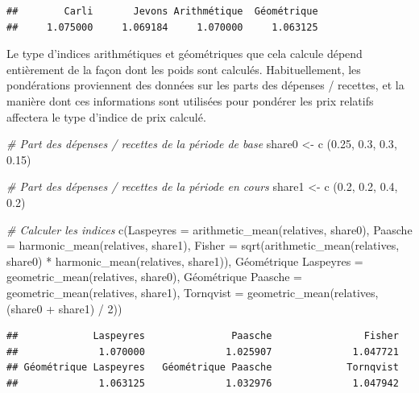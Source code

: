 \documentclass[
]{article}
\newenvironment{Shaded}{\begin{snugshade}}{\end{snugshade}}
\newcommand{\AttributeTok}[1]{\textcolor[rgb]{0.77,0.63,0.00}{#1}}
\newcommand{\CommentTok}[1]{\textcolor[rgb]{0.56,0.35,0.01}{\textit{#1}}}
\newcommand{\DecValTok}[1]{\textcolor[rgb]{0.00,0.00,0.81}{#1}}
\newcommand{\FloatTok}[1]{\textcolor[rgb]{0.00,0.00,0.81}{#1}}
\newcommand{\FunctionTok}[1]{\textcolor[rgb]{0.00,0.00,0.00}{#1}}
\newcommand{\NormalTok}[1]{#1}
\newcommand{\OtherTok}[1]{\textcolor[rgb]{0.56,0.35,0.01}{#1}}
\newcommand{\SpecialCharTok}[1]{\textcolor[rgb]{0.00,0.00,0.00}{#1}}
\newcommand{\StringTok}[1]{\textcolor[rgb]{0.31,0.60,0.02}{#1}}
\begin{document}
\begin{verbatim}
##        Carli       Jevons Arithmétique  Géométrique 
##     1.075000     1.069184     1.070000     1.063125
\end{verbatim}

Le type d'indices arithmétiques et géométriques que cela calcule dépend entièrement de la façon dont les poids sont calculés. Habituellement, les pondérations proviennent des données sur les parts des dépenses / recettes, et la manière dont ces informations sont utilisées pour pondérer les prix relatifs affectera le type d'indice de prix calculé.

\begin{Shaded}
\begin{Highlighting}[]
\CommentTok{\# Part des dépenses / recettes de la période de base}
\NormalTok{share0 }\OtherTok{\textless{}{-}} \FunctionTok{c}\NormalTok{ (}\FloatTok{0.25}\NormalTok{, }\FloatTok{0.3}\NormalTok{, }\FloatTok{0.3}\NormalTok{, }\FloatTok{0.15}\NormalTok{)}

\CommentTok{\# Part des dépenses / recettes de la période en cours}
\NormalTok{share1 }\OtherTok{\textless{}{-}} \FunctionTok{c}\NormalTok{ (}\FloatTok{0.2}\NormalTok{, }\FloatTok{0.2}\NormalTok{, }\FloatTok{0.4}\NormalTok{, }\FloatTok{0.2}\NormalTok{)}

\CommentTok{\# Calculer les indices}
\FunctionTok{c}\NormalTok{(}\AttributeTok{Laspeyres =} \FunctionTok{arithmetic\_mean}\NormalTok{(relatives, share0),}
  \AttributeTok{Paasche =} \FunctionTok{harmonic\_mean}\NormalTok{(relatives, share1),}
  \AttributeTok{Fisher =} \FunctionTok{sqrt}\NormalTok{(}\FunctionTok{arithmetic\_mean}\NormalTok{(relatives, share0) }\SpecialCharTok{*} 
                  \FunctionTok{harmonic\_mean}\NormalTok{(relatives, share1)),}
  \StringTok{\textasciigrave{}}\AttributeTok{Géométrique Laspeyres}\StringTok{\textasciigrave{}} \OtherTok{=} \FunctionTok{geometric\_mean}\NormalTok{(relatives, share0),}
  \StringTok{\textasciigrave{}}\AttributeTok{Géométrique Paasche}\StringTok{\textasciigrave{}} \OtherTok{=} \FunctionTok{geometric\_mean}\NormalTok{(relatives, share1),}
  \AttributeTok{Tornqvist =} \FunctionTok{geometric\_mean}\NormalTok{(relatives, (share0 }\SpecialCharTok{+}\NormalTok{ share1) }\SpecialCharTok{/} \DecValTok{2}\NormalTok{))}
\end{Highlighting}
\end{Shaded}

\begin{verbatim}
##             Laspeyres               Paasche                Fisher 
##              1.070000              1.025907              1.047721 
## Géométrique Laspeyres   Géométrique Paasche             Tornqvist 
##              1.063125              1.032976              1.047942
\end{verbatim}
\end{document}
